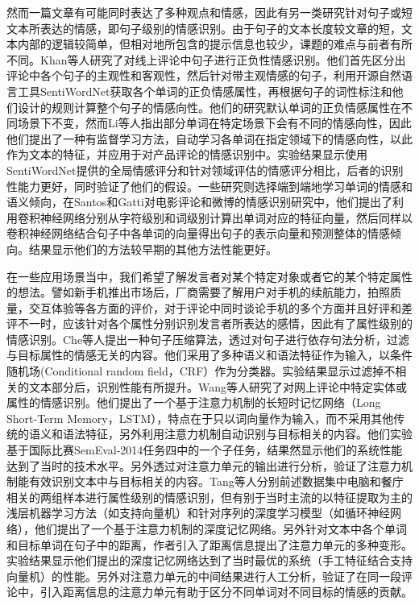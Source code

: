 然而一篇文章有可能同时表达了多种观点和情感，因此有另一类研究针对句子或短文本所表达的情感，即句子级别的情感识别。由于句子的文本长度较文章的短，文本内部的逻辑较简单，但相对地所包含的提示信息也较少，课题的难点与前者有所不同。Khan等人\cite{khan2011sentiment}研究了对线上评论中句子进行正负性情感识别。他们首先区分出评论中各个句子的主观性和客观性，然后针对带主观情感的句子，利用开源自然语言工具SentiWordNet获取各个单词的正负情感属性，再根据句子的词性标注和他们设计的规则计算整个句子的情感向性。他们的研究默认单词的正负情感属性在不同场景下不变，然而Li等人\cite{li2013constructing}指出部分单词在特定场景下会有不同的情感向性，因此他们提出了一种有监督学习方法，自动学习各单词在指定领域下的情感向性，以此作为文本的特征，并应用于对产品评论的情感识别中。实验结果显示使用SentiWordNet提供的全局情感评分和针对领域评估的情感评分相比，后者的识别性能力更好，同时验证了他们的假设。一些研究则选择端到端地学习单词的情感和语义倾向，在Santos和Gatti\cite{dos2014deep}对电影评论和微博的情感识别研究中，他们提出了利用卷积神经网络分别从字符级别和词级别计算出单词对应的特征向量，然后同样以卷积神经网络结合句子中各单词的向量得出句子的表示向量和预测整体的情感倾向。结果显示他们的方法较早期的其他方法性能更好。

在一些应用场景当中，我们希望了解发言者对某个特定对象或者它的某个特定属性的想法。譬如新手机推出市场后，厂商需要了解用户对手机的续航能力，拍照质量，交互体验等各方面的评价，对于评论中同时谈论手机的多个方面并且好评和差评不一时，应该针对各个属性分别识别发言者所表达的感情，因此有了属性级别的情感识别。Che等人\cite{che2015sentence}提出一种句子压缩算法，透过对句子进行依存句法分析，过滤与目标属性的情感无关的内容。他们采用了多种语义和语法特征作为输入，以条件随机场(Conditional random field，CRF）作为分类器。实验结果显示过滤掉不相关的文本部分后，识别性能有所提升。Wang等人\cite{wang2016attention}研究了对网上评论中特定实体或属性的情感识别。他们提出了一个基于注意力机制的长短时记忆网络（Long Short-Term Memory，LSTM），特点在于只以词向量作为输入，而不采用其他传统的语义和语法特征，另外利用注意力机制自动识别与目标相关的内容。他们实验基于国际比赛SemEval-2014任务四\cite{pontiki2014semeval}中的一个子任务，结果然显示他们的系统性能达到了当时的技术水平。另外透过对注意力单元的输出进行分析，验证了注意力机制能有效识别文本中与目标相关的内容。Tang等人\cite{tang2016aspect}分别前述数据集中电脑和餐庁相关的两组样本进行属性级别的情感识别，但有别于当时主流的以特征提取为主的浅层机器学习方法（如支持向量机）和针对序列的深度学习模型（如循环神经网络），他们提出了一个基于注意力机制的深度记忆网络。另外针对文本中各个单词和目标单词在句子中的距离，作者引入了距离信息提出了注意力单元的多种变形。实验结果显示他们提出的深度记忆网络达到了当时最优的系统（手工特征结合支持向量机）的性能。另外对注意力单元的中间结果进行人工分析，验证了在同一段评论中，引入距离信息的注意力单元有助于区分不同单词对不同目标的情感的贡献。

